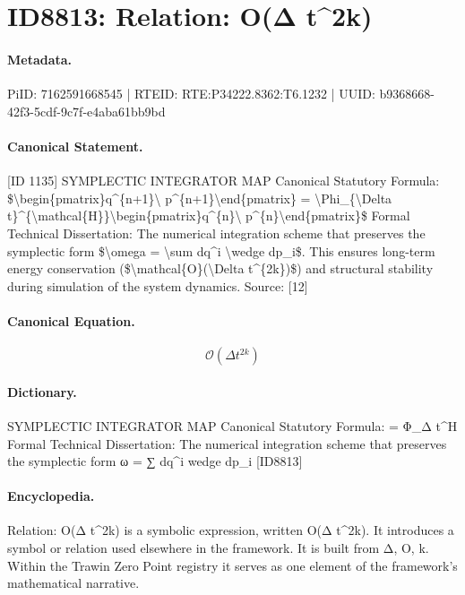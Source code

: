 \section*{ID8813: Relation: O(Δ t\textasciicircum{}2k)}
\paragraph{Metadata.}
PiID: 7162591668545 | RTEID: RTE:P34222.8362:T6.1232 | UUID: b9368668-42f3-5cdf-9c7f-e4aba61bb9bd

\paragraph{Canonical Statement.}
[ID 1135] SYMPLECTIC INTEGRATOR MAP Canonical Statutory Formula: \$\textbackslash{}begin\{pmatrix\}q\textasciicircum{}\{n+1\}\textbackslash{} p\textasciicircum{}\{n+1\}\textbackslash{}end\{pmatrix\} = \textbackslash{}Phi\_\{\textbackslash{}Delta t\}\textasciicircum{}\{\textbackslash{}mathcal\{H\}\}\textbackslash{}begin\{pmatrix\}q\textasciicircum{}\{n\}\textbackslash{} p\textasciicircum{}\{n\}\textbackslash{}end\{pmatrix\}\$ Formal Technical Dissertation: The numerical integration scheme that preserves the symplectic form \$\textbackslash{}omega = \textbackslash{}sum dq\textasciicircum{}i \textbackslash{}wedge dp\_i\$. This ensures long-term energy conservation (\$\textbackslash{}mathcal\{O\}(\textbackslash{}Delta t\textasciicircum{}\{2k\})\$) and structural stability during simulation of the system dynamics. Source: [12]

\paragraph{Canonical Equation.}
\[
\mathcal{O}(\Delta t^{2k})
\]

\paragraph{Dictionary.}
SYMPLECTIC INTEGRATOR MAP Canonical Statutory Formula: = Φ\_Δ t\textasciicircum{}H Formal Technical Dissertation: The numerical integration scheme that preserves the symplectic form ω = ∑ dq\textasciicircum{}i wedge dp\_i [ID8813]

\paragraph{Encyclopedia.}
Relation: O(Δ t\textasciicircum{}2k) is a symbolic expression, written O(Δ t\textasciicircum{}2k). It introduces a symbol or relation used elsewhere in the framework. It is built from Δ, O, k. Within the Trawin Zero Point registry it serves as one element of the framework's mathematical narrative.
